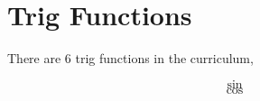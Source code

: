 \documentclass[../main.tex]{subfiles}
\begin{document}
\section{Trig Functions}

There are 6 trig functions in the curriculum,

\[ \sin \]
\[ \cos \]
\end{document}
